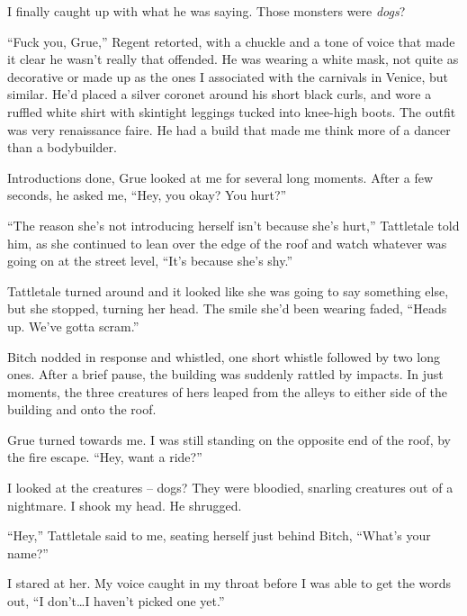 I finally caught up with what he was saying.  Those monsters were \emph{dogs}?



``Fuck you, Grue,'' Regent retorted, with a chuckle and a tone of voice that made it clear he wasn't really that offended.  He was wearing a white mask, not quite as decorative or made up as the ones I associated with the carnivals in Venice, but similar.  He'd placed a silver coronet around his short black curls, and wore a ruffled white shirt with skintight leggings tucked into knee-high boots.  The outfit was very renaissance faire.  He had a build that made me think more of a dancer than a bodybuilder.



Introductions done, Grue looked at me for several long moments.  After a few seconds, he asked me, ``Hey, you okay?  You hurt?''



``The reason she's not introducing herself isn't because she's hurt,'' Tattletale told him, as she continued to lean over the edge of the roof and watch whatever was going on at the street level, ``It's because she's shy.''



Tattletale turned around and it looked like she was going to say something else, but she stopped, turning her head.  The smile she'd been wearing faded, ``Heads up.  We've gotta scram.''



Bitch nodded in response and whistled, one short whistle followed by two long ones.  After a brief pause, the building was suddenly rattled by impacts.  In just moments, the three creatures of hers leaped from the alleys to either side of the building and onto the roof.



Grue turned towards me.  I was still standing on the opposite end of the roof, by the fire escape. ``Hey, want a ride?''



I looked at the creatures – dogs?  They were bloodied, snarling creatures out of a nightmare.  I shook my head.  He shrugged.



``Hey,'' Tattletale said to me, seating herself just behind Bitch, ``What's your name?''



I stared at her.  My voice caught in my throat before I was able to get the words out, ``I don't\ldots I haven't picked one yet.''



